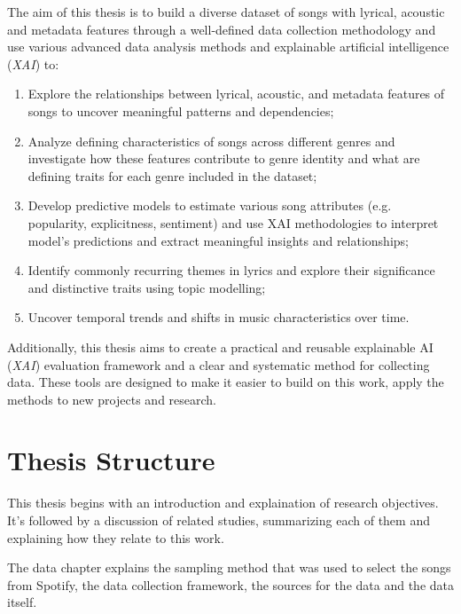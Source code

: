 The aim of this thesis is to build a diverse dataset of songs with lyrical,
acoustic and metadata features through a well-defined data collection
methodology and use various advanced data analysis methods and explainable
artificial intelligence (\textit{XAI}) to:

\begin{enumerate}
  \item Explore the relationships between lyrical, acoustic, and metadata
    features of songs to uncover meaningful patterns and dependencies;
  \item Analyze defining characteristics of songs across different genres and
    investigate how these features contribute to genre identity and what are
    defining traits for each genre included in the dataset;
  \item Develop predictive models to estimate various song attributes (e.g.
    popularity, explicitness, sentiment) and use XAI methodologies to interpret
    model's predictions and extract meaningful insights and relationships;
  \item Identify commonly recurring themes in lyrics and explore their
    significance and distinctive traits using topic modelling;
  \item Uncover temporal trends and shifts in music characteristics over time.
\end{enumerate}

Additionally, this thesis aims to create a practical and reusable explainable
AI (\textit{XAI}) evaluation framework and a clear and systematic method for
collecting data. These tools are designed to make it easier to build on this
work, apply the methods to new projects and research.




\section{Thesis Structure}
\label{sec:thesisstructure}

This thesis begins with an introduction and explaination of research objectives.
It's followed by a discussion of related studies, summarizing each of them and
explaining how  they relate to this work. 

The data chapter explains the sampling method that was used to select the songs
from Spotify, the data collection framework, the sources for the data and the
data itself.

